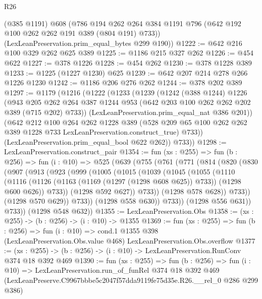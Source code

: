 \begin{lexlean}{R26}
\begin{coremodule}
      (@385 @1191)
      @608
      (@786 @194 @262 @264 @384 @1191 @796 (@642 @192 @100 @262 @262 @191 @389 (@804 @191) @733))
      (LexLeanPreservation.prim_equal_bytes @299 @190))
@1222 := @642 @216 @100 @329 @262 @625 @389
@1225 := @1186 @215 @327 @262
@1226 := @454 @622
@1227 := @378 @1226
@1228 := @454 @262
@1230 := @378 @1228 @389
@1233 := @1225 (@1227 @1230) @625
@1239 := @642 @207 @214 @278 @266 @1226 @1230
@1242 := @1186 @206 @276 @262
@1244 := @378 @202 @389
@1297 := @1179
    (@1216
      (@1222
        (@1233
          (@1239
            (@1242
              (@388 @1244)
              @1226
              (@943
                @205
                @262
                @264
                @387
                @1244
                @953
                (@642 @203 @100 @262 @262 @202 @389 (@715 @202) @733))
              (LexLeanPreservation.prim_equal_nat @386 @201))
            (@642
              @212
              @100
              @264
              @262
              @1228
              @389
              (@528 @209 @65 @100 @262 @262 @389 @1228 @733 LexLeanPreservation.construct_true)
              @733))
          (LexLeanPreservation.prim_equal_bool @622 @262))
        @733))
@1298 := LexLeanPreservation.construct_pair
@1354 := fun (xs : @255) =>
  fun (b : @256) =>
  fun (i : @10) =>
  @525
    (@639
      (@755
        (@761
          (@771
            (@814
              (@820
                (@830
                  (@907
                    (@913
                      (@923
                        (@999
                          (@1005
                            (@1015
                              (@1039
                                (@1045
                                  (@1055
                                    (@1110
                                      (@1116
                                        (@1126
                                          (@1163 (@1169 (@1297 (@1298 @608 @625)) @733))
                                          (@1298 @600 @626))
                                        @733))
                                    (@1298 @592 @627))
                                  @733))
                              (@1298 @578 @628))
                            @733))
                        (@1298 @570 @629))
                      @733))
                  (@1298 @558 @630))
                @733))
            (@1298 @556 @631))
          @733))
      (@1298 @548 @632))
@1355 := LexLeanPreservation.Obs
@1358 := (xs : @255) -> (b : @256) -> (i : @10) -> @1355
@1369 := fun (xs : @255) =>
  fun (b : @256) =>
  fun (i : @10) =>
  cond.{1} @1355 @398 (LexLeanPreservation.Obs.value @468) LexLeanPreservation.Obs.overflow
@1377 := (xs : @255) -> (b : @256) -> (i : @10) -> LexLeanPreservation.RunConv @374 @18 @392 @469
@1390 := fun (xs : @255) =>
  fun (b : @256) =>
  fun (i : @10) =>
  LexLeanPreservation.run_of_funRel
    @374
    @18
    @392
    @469
    (LexLeanPreserve.C9967bbbe5c2047f57dda9119fe75d35e.R26.__rel_0 @286 @299 @386)
\end{coremodule}
\end{lexlean}
